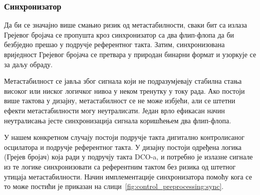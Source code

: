 \documentclass[master]{finthesis}
\def \DCO  {DCO} %
\begin{document}
\subsubsection{Синхронизатор} \label{section:control_preprocessing:sync}
Да би се значајно више смањио ризик од метастабилности, сваки бит са излаза Грејевог бројача се пропушта кроз синхронизатор са два флип-флопа да би безбједно прешао у подручје референтног такта. Затим, синхронизована вриједност Грејевог бројача се претвара у природан бинарни формат и узоркује се за даљу обраду.\par
Метастабилност се јавља због сигнала који не подразумјевају стабилна стања високог или ниског логичког нивоа у неком тренутку у току рада. Ако постоји више тактова у дизајну, метастабилност се не може избјећи, али се штетни ефекти метастабилности могу неутралисати. Један врло ефикасан начин неутралисања јесте синхронизација сигнала коришћењем два флип-флопа. \par
У нашем конкретном случају постоји подручје такта дигитално контролисаног осцилатора и подручје референтног такта. У дизајну постоји одређена логика (Грејев бројач) која ради у подручју такта \DCO-a, и потребно је излазне сигнале из те логике синхронизовати са референтним тактом без ризика од штетног утицаја метастабилности. Начин имплементације синхронизатора помоћу кога се то може постићи је приказан на слици~\ref{fig:control_preprocessing:sync}. \par

\end{document}
